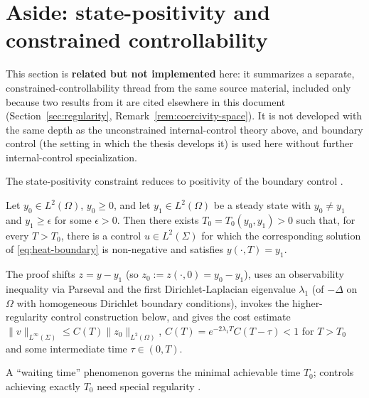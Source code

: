 \section{Aside: state-positivity and constrained controllability}
\label{sec:constrained-aside}

This section is \textbf{related but not implemented} here: it summarizes a
separate, constrained-controllability thread from the same source material,
included only because two results from it are cited elsewhere in this
document (Section~\ref{sec:regularity}, Remark~\ref{rem:coercivity-space}).
It is not developed with the same depth as the unconstrained internal-control
theory above, and boundary control (the setting in which the thesis develops
it) is used here without further internal-control specialization.

\begin{lemma}
  The state-positivity constraint reduces to positivity of the boundary
  control \citep[Lem.~4.1]{pao2012nonlinear}.
\end{lemma}

\begin{theorem}
  \label{thm:constrained-linear}
  Let $y_0 \in L^2(\Omega)$, $y_0 \ge 0$, and let $y_1 \in L^2(\Omega)$ be a
  steady state with $y_0 \ne y_1$ and $y_1 \ge \epsilon$ for some
  $\epsilon>0$. Then there exists $T_0 = T_0(y_0,y_1)>0$ such that, for every
  $T>T_0$, there is a control $u \in L^2(\Sigma)$ for which the corresponding
  solution of \eqref{eq:heat-boundary} is non-negative and satisfies
  $y(\cdot,T) = y_1$.
\end{theorem}

The proof shifts $z = y - y_1$ (so $z_0 := z(\cdot,0) = y_0-y_1$), uses an
observability inequality via Parseval and the first Dirichlet-Laplacian
eigenvalue $\lambda_1$ (of $-\Delta$ on $\Omega$ with homogeneous Dirichlet
boundary conditions), invokes the higher-regularity control construction
below, and gives the cost estimate
$\|v\|_{L^\infty(\Sigma)} \le C(T)\|z_0\|_{L^2(\Omega)}$,
$C(T)=e^{-2\lambda_1 T}C(T-\tau) < 1$ for $T>T_0$ and some intermediate time
$\tau \in (0,T)$.

\begin{remark}
  A ``waiting time'' phenomenon governs the minimal achievable time $T_0$;
  controls achieving exactly $T_0$ need special regularity
  \citep[Thm.~4]{loheac2017minimal}.
\end{remark}


